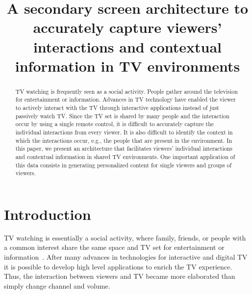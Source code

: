 \documentclass[conference,a4paper]{IEEEtran}
\begin{document}
\title{A secondary screen architecture to accurately capture viewers' interactions and contextual information in TV environments}

\author{
\and
{}
}
\maketitle

\begin{abstract}
TV watching is frequently seen as a social activity. People gather around the television for entertainment or information. Advances in TV technology have enabled the viewer to actively interact with the TV through interactive applications instead of just passively watch TV. Since the TV set is shared by many people and the interaction occur by using a single remote control, it is difficult to accurately capture the individual interactions from every viewer. It is also difficult to identify the context in which the interactions occur, e.g., the people that are present in the environment. In this paper, we present an architecture that facilitates viewers' individual interactions and contextual information in shared TV environments. One important application of this data consists in generating personalized content for single viewers and groups of viewers.
\end{abstract}

\IEEEpeerreviewmaketitle

\section{Introduction}

TV watching is essentially a social activity, where family, friends, or people with a common interest share the same space and TV set for entertainment or information~\cite{Masthoff2004}. After many advances in technologies for interactive and digital TV it is possible to develop high level applications to enrich the TV experience. Thus, the interaction between viewers and TV became more elaborated than simply change channel and volume.
\end{document}
